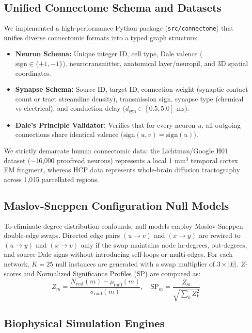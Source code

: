 \documentclass[10pt,twocolumn,letterpaper]{article}
\begin{document}
\subsection{Unified Connectome Schema and Datasets}
We implemented a high-performance Python package (\texttt{src/connectome}) that unifies diverse connectomic formats into a typed graph structure:
\begin{itemize}[leftmargin=*]
    \item \textbf{Neuron Schema:} Unique integer ID, cell type, Dale valence ($\text{sign} \in \{+1, -1\}$), neurotransmitter, anatomical layer/neuropil, and 3D spatial coordinates.
    \item \textbf{Synapse Schema:} Source ID, target ID, connection weight (synaptic contact count or tract streamline density), transmission sign, synapse type (chemical vs electrical), and conduction delay ($d_{\mathrm{syn}} \in [0.5, 5.0]\text{ ms}$).
    \item \textbf{Dale's Principle Validator:} Verifies that for every neuron $u$, all outgoing connections share identical valence ($\text{sign}(u, v) = \text{sign}(u)$).
\end{itemize}
We strictly demarcate human connectomic data: the Lichtman/Google H01 dataset ($\sim$16,000 proofread neurons) represents a local 1 mm$^3$ temporal cortex EM fragment, whereas HCP data represents whole-brain diffusion tractography across 1,015 parcellated regions.

\subsection{Maslov-Sneppen Configuration Null Models}
To eliminate degree distribution confounds, null models employ Maslov-Sneppen double-edge swaps. Directed edge pairs $(u \to v)$ and $(x \to y)$ are rewired to $(u \to y)$ and $(x \to v)$ only if the swap maintains node in-degrees, out-degrees, and source Dale signs without introducing self-loops or multi-edges. For each network, $K = 25$ null instances are generated with a swap multiplier of $3 \times |E|$. $Z$-scores and Normalized Significance Profiles (SP) are computed as:
\begin{equation}
Z_m = \frac{N_{\mathrm{real}}(m) - \mu_{\mathrm{null}}(m)}{\sigma_{\mathrm{null}}(m)}, \quad \mathrm{SP}_m = \frac{Z_m}{\sqrt{\sum_k Z_k^2}}
\end{equation}

\subsection{Biophysical Simulation Engines}
\end{document}
